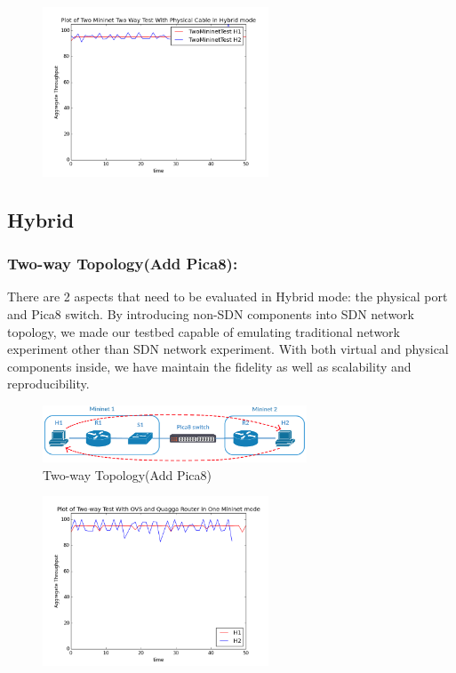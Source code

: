 \begin{figure}[h]
\centering
\includegraphics[width=0.6\textwidth]{./Figure/Hybrid/TwoWay/TwoMininetPlot.png}
\end{figure}

\subsection{Hybrid}\label{hybrid}

\subsubsection{Two-way Topology(Add Pica8):}\label{two-way-topologyadd-pica8}

There are 2 aspects that need to be evaluated in Hybrid mode: the
physical port and Pica8 switch. By introducing non-SDN components into
SDN network topology, we made our testbed capable of emulating
traditional network experiment other than SDN network experiment. With
both virtual and physical components inside, we have maintain the
fidelity as well as scalability and reproducibility.


\begin{figure}[h]
\centering
\includegraphics[width=0.7\textwidth]{./Figure/Hybrid/AddPica8/AddPica8(Hybrid).png}
\caption{Two-way Topology(Add Pica8) \label{fig:Two-way Topology(Add Pica8)}}
\end{figure}

\begin{figure}[h]
\centering
\includegraphics[width=0.6\textwidth]{./Figure/Hybrid/AddPica8/AddPica8.png}
\end{figure}

